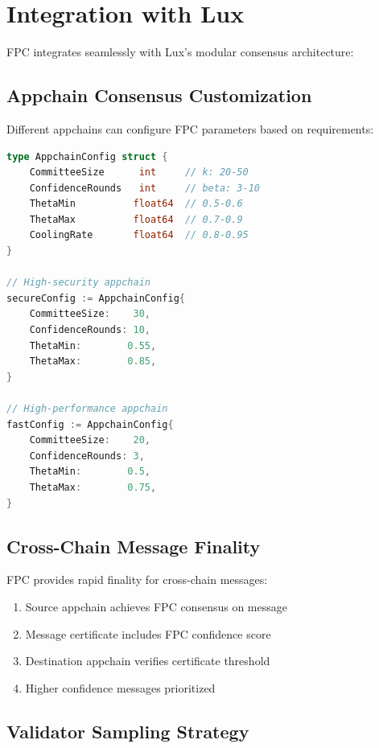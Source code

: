 \section{Integration with Lux}

\label{sec:integration}

FPC integrates seamlessly with Lux's modular consensus architecture:

\subsection{Appchain Consensus Customization}

Different appchains can configure FPC parameters based on requirements:

\begin{lstlisting}[language=Go, caption=Appchain-specific FPC configuration]
type AppchainConfig struct {
    CommitteeSize      int     // k: 20-50
    ConfidenceRounds   int     // beta: 3-10
    ThetaMin          float64  // 0.5-0.6
    ThetaMax          float64  // 0.7-0.9
    CoolingRate       float64  // 0.8-0.95
}

// High-security appchain
secureConfig := AppchainConfig{
    CommitteeSize:    30,
    ConfidenceRounds: 10,
    ThetaMin:        0.55,
    ThetaMax:        0.85,
}

// High-performance appchain  
fastConfig := AppchainConfig{
    CommitteeSize:    20,
    ConfidenceRounds: 3,
    ThetaMin:        0.5,
    ThetaMax:        0.75,
}
\end{lstlisting}

\subsection{Cross-Chain Message Finality}

FPC provides rapid finality for cross-chain messages:

\begin{enumerate}
\item Source appchain achieves FPC consensus on message
\item Message certificate includes FPC confidence score
\item Destination appchain verifies certificate threshold
\item Higher confidence messages prioritized
\end{enumerate}

\subsection{Validator Sampling Strategy}

